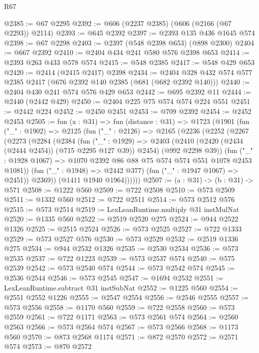 \begin{lexlean}{R67}
\begin{coremodule}
@2385 := @67 @2295
@2392 := @606 (@2237 @2385) (@606 (@2166 (@67 @2293)) @2114)
@2393 := @645 @2392
@2397 := @2393 @135 @436 @1645 @574
@2398 := @67 @2298
@2403 := @2397 (@548 @2398 @653) (@898 @2300)
@2404 := @667 @2392
@2410 := @2404 @434 @241 @580 @576 @2398 @653
@2414 := @2393 @263 @433 @578 @574
@2415 := @548 @2385
@2417 := @548 @429 @653
@2420 := @2414 (@2415 @2417) @2398
@2434 := @2404 @328 @432 @574 @577 @2385 @2417 (@676 @2392 @140 @2385 (@681 (@682 @2392 @140)))
@2440 := @2404 @430 @241 @574 @576 @429 @653
@2442 := @695 @2392 @11
@2444 := @2440 (@2442 @429)
@2450 := @2404 @225 @75 @574 @574 @224 @551
@2451 := @2442 @224
@2452 := @2450 @2451
@2453 := @709 @2392
@2454 := @2452 @2453
@2505 := fun (x : @31) =>
  fun (distance : @31) =>
  @1723
    (@1901
      (fun ("_" : @1902) =>
      @2125
        (fun ("_" : @2126) =>
        @2165
          (@2236
            (@2252
              (@2267
                (@2273
                  (@2284
                    (@2384
                      (fun ("_" : @1929) =>
                      @2403
                        (@2410 (@2420 (@2434 (@2444 @2454)) (@715 @2295 @127 @39)) @2454)
                        (@992 @2298 @39))
                      (fun ("_" : @1928 @1067) =>
                      @1070 @2392 @86 @88 @75 @574 @574 @551 @1078 @2453 @1081))
                    (fun ("_" : @1948) => @2442 @377)
                    (fun ("_" : @1947 @1067) => @2451))
                  @2369))
              (@1411 @1940 @1964))))))
@2507 := (a : @31) -> (b : @31) -> @571
@2508 := @1222 @560
@2509 := @722 @2508
@2510 := @573 @2509
@2511 := @1332 @560
@2512 := @722 @2511
@2514 := @573 @2512 @576
@2515 := @573 @2514
@2519 := LexLeanRuntime.multiply @31 instMulNat
@2520 := @1335 @560
@2522 := @2519 @2520 @275
@2524 := @944 @2522 @1326
@2525 := @2515 @2524
@2526 := @573 @2525
@2527 := @722 @1333
@2529 := @573 @2527 @576
@2530 := @573 @2529
@2532 := @2519 @1336 @275
@2534 := @944 @2532 @1326
@2535 := @2530 @2534
@2536 := @573 @2535
@2537 := @722 @1223
@2539 := @573 @2537 @574
@2540 := @575 @2539
@2542 := @573 @2540 @574
@2544 := @573 @2542 @574
@2545 := @2536 @2544
@2546 := @573 @2545
@2547 := @1694 @2532
@2551 := LexLeanRuntime.subtract @31 instSubNat
@2552 := @1225 @560
@2554 := @2551 @2552 @1226
@2555 := @2547 @2554
@2556 := @2546 @2555
@2557 := @573 @2556
@2558 := @1170 @560
@2559 := @722 @2558
@2560 := @573 @2559
@2561 := @722 @1171
@2563 := @573 @2561 @574
@2564 := @2560 @2563
@2566 := @573 @2564 @574
@2567 := @573 @2566
@2568 := @1173 @560
@2570 := @873 @2568 @1174
@2571 := @872 @2570
@2572 := @2571 @574
@2573 := @870 @2572

\end{coremodule}
\end{lexlean}
